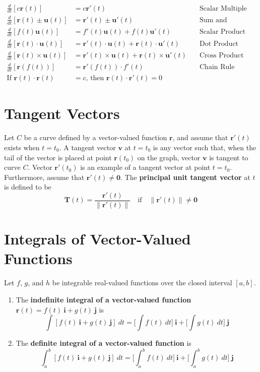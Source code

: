 \documentclass{article}
\begin{document}
\[\begin{aligned}
    \frac{d}{dt}[c\mathbf{r}(t)] &= c\mathbf{r}'(t) \quad & \text{Scalar Multiple} \\
    \frac{d}{dt}[\mathbf{r}(t)\pm \mathbf{u}(t)] &= \mathbf{r}'(t)\pm\mathbf{u}'(t) \quad & \text{Sum and Difference} \\
    \frac{d}{dt}[f(t)\mathbf{u}(t)] &= f'(t)\mathbf{u}(t)+f(t)\mathbf{u}'(t) \quad & \text{Scalar Product} \\
    \frac{d}{dt}[\mathbf{r}(t)\cdot\mathbf{u}(t)] &= \mathbf{r}'(t)\cdot\mathbf{u}(t)+\mathbf{r}(t)\cdot\mathbf{u}'(t) \quad & \text{Dot Product} \\
    \frac{d}{dt}[\mathbf{r}(t)\times\mathbf{u}(t)] &= \mathbf{r}'(t)\times\mathbf{u}(t)+\mathbf{r}(t)\times\mathbf{u}'(t) \quad & \text{Cross Product} \\
    \frac{d}{dt}[\mathbf{r}(f(t))] &= \mathbf{r}'(f(t))\cdot f'(t) \quad & \text{Chain Rule} \\
    \text{If }\mathbf{r}(t)\cdot\mathbf{r}(t) &= c\text{, then }\mathbf{r}(t)\cdot\mathbf{r}'(t)=0
\end{aligned}\]

\section*{Tangent Vectors}

Let $C$ be a curve defined by a vector-valued function $\mathbf{r}$, and assume that $\mathbf{r}'(t)$ exists when $t=t_0$. A tangent vector $\mathbf{v}$ at $t=t_0$ is any vector such that, when the tail of the vector is placed at point $\mathbf{r}(t_0)$ on the graph, vector $\mathbf{v}$ is tangent to curve $C$. Vector $\mathbf{r}'(t_0)$ is an example of a tangent vector at point $t=t_0$. Furthermore, assume that $\mathbf{r}'(t)\neq\mathbf{0}$. The \textbf{principal unit tangent vector} at $t$ is defined to be
\[\mathbf{T}(t)=\frac{\mathbf{r}'(t)}{\|\mathbf{r}'(t)\|}\quad\text{if}\quad \|\mathbf{r}'(t)\| \neq \mathbf{0}\]

\section*{Integrals of Vector-Valued Functions}

Let $f$, $g$, and $h$ be integrable real-valued functions over the closed interval $[a, b]$.
\begin{enumerate}
    \item The \textbf{indefinite integral of a vector-valued function} $\mathbf{r}(t)=f(t)\:\mathbf{i}+g(t)\:\mathbf{j}$ is
    \[\int [f(t)\:\mathbf{i}+g(t)\:\mathbf{j}]\: dt=\Big[\int f(t)\: dt\Big]\:\mathbf{i}+\Big[\int g(t)\: dt\Big]\:\mathbf{j}\]
    \item The \textbf{definite integral of a vector-valued function} is
    \[\int_a^b [f(t)\:\mathbf{i}+g(t)\:\mathbf{j}]\: dt=\Big[\int_a^b f(t)\: dt\Big]\:\mathbf{i}+\Big[\int_a^b g(t)\: dt\Big]\:\mathbf{j}\]
\end{enumerate}
\end{document}
